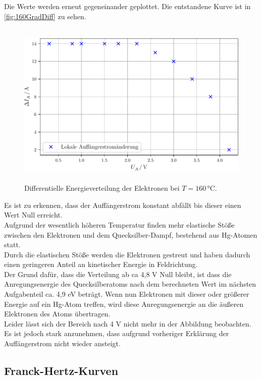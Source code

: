 Die Werte werden erneut gegeneinander geplottet. Die entstandene Kurve ist in \autoref{fig:160GradDiff}
zu sehen.\\

\begin{figure}[H]
  \centering
  \includegraphics[height=8cm]{build/160Grad.pdf}
  \caption{Differentielle Energieverteilung der Elektronen bei $T=160\,\si{\celsius}$.}
  \label{fig:160GradDiff}
\end{figure}

Es ist zu erkennen, dass der Auffängerstrom konstant abfällt bis dieser einen Wert Null erreicht.\\
Aufgrund der wesentlich höheren Temperatur finden mehr elastische Stöße zwischen den Elektronen
und dem Quecksilber-Dampf, bestehend aus Hg-Atomen statt.\\
Durch die elastischen Stöße werden die Elektronen gestreut und haben dadurch einen geringeren
Anteil an kinetischer Energie in Feldrichtung.\\
Der Grund dafür, dass die Verteilung ab ca 4,8 V Null bleibt, ist dass die Anregungsenergie des
Quecksilberatoms nach dem berechneten Wert im nächsten Aufgabenteil ca. 4,9 eV beträgt. Wenn nun Elektronen mit dieser oder größerer
Energie auf ein Hg-Atom treffen, wird diese Anregungsenergie an die äußeren Elektronen des Atoms
übertragen.\\
Leider lässt sich der Bereich nach 4 V nicht mehr in der Abbildung beobachten. Es ist jedoch
stark anzunehmen, dass aufgrund vorheriger Erklärung der Auffängerstrom nicht wieder ansteigt.

\subsection{Franck-Hertz-Kurven}

